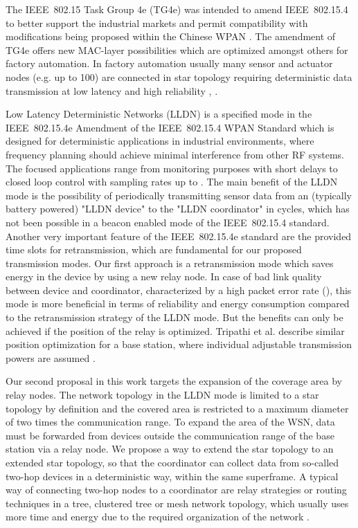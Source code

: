 \documentclass[times,10pt,twocolumn]{article}
\begin{document}
The IEEE~802.15 Task Group 4e (TG4e) was intended to amend IEEE~802.15.4 to better support the industrial markets and permit compatibility with modifications being proposed within the Chinese WPAN \cite{IEEE_STD_802.15.4e-2012}. The amendment of TG4e offers new MAC-layer possibilities which are optimized amongst others for factory automation. In factory automation usually many sensor and actuator nodes (e.g. up to 100) are connected in star topology requiring deterministic data transmission at low latency and high reliability \cite{first_variant_of_IEEE_802.15.4e}, \cite{study_of_IEEE_802.15.4e}.

Low Latency Deterministic Networks (LLDN) is a specified mode in the IEEE~802.15.4e Amendment of the IEEE~802.15.4 WPAN Standard which is designed for deterministic applications in industrial environments, where frequency planning should achieve minimal interference from other RF systems. The focused applications range from monitoring purposes with short delays to closed loop control with sampling rates up to . The main benefit of the LLDN mode is the possibility of periodically transmitting sensor data from an (typically battery powered) "LLDN device" to the "LLDN coordinator" in  cycles, which has not been possible in a beacon enabled mode of the IEEE~802.15.4 standard. Another very important feature of the IEEE~802.15.4e standard are the provided time slots for retransmission, which are fundamental for our proposed transmission modes. Our first approach is a retransmission mode which saves energy in the device by using a new relay node. In case of bad link quality between device and coordinator, characterized by a high packet error rate (), this mode is more beneficial in terms of reliability and energy consumption compared to the retransmission strategy of the LLDN mode. But the benefits can only be achieved if the position of the relay is optimized. Tripathi et al. describe similar position optimization for a base station, where individual adjustable transmission powers are assumed \cite{optimal_position_in_two_tiered_WSN}.

Our second proposal in this work targets the expansion of the coverage area by relay nodes. The network topology in the LLDN mode is limited to a star topology by definition and the covered area is restricted to a maximum diameter of two times the communication range. To expand the area of the WSN, data must be forwarded from devices outside the communication range of the base station via a relay node. We propose a way to extend the star topology to an extended star topology, so that the coordinator can collect data from so-called two-hop devices in a deterministic way, within the same superframe. A typical way of connecting two-hop nodes to a coordinator are relay strategies \cite{survey_multipoint_relay} or routing techniques in a tree, clustered tree \cite{cross_layer_topology_optimization} or mesh network topology, which usually uses more time and energy due to the required organization of the network \cite{routing_in_wsn}.
\end{document}
